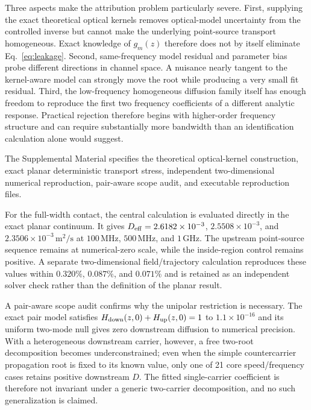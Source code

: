 \documentclass[aps,pra,twocolumn,superscriptaddress,nofootinbib]{revtex4-2}
\begin{document}
Three aspects make the attribution problem particularly severe. First, supplying the exact theoretical optical kernels removes optical-model uncertainty from the controlled inverse but cannot make the underlying point-source transport homogeneous. Exact knowledge of $g_m(z)$ therefore does not by itself eliminate Eq.~\eqref{eq:leakage}. Second, same-frequency model residual and parameter bias probe different directions in channel space. A nuisance nearly tangent to the kernel-aware model can strongly move the root while producing a very small fit residual. Third, the low-frequency homogeneous diffusion family itself has enough freedom to reproduce the first two frequency coefficients of a different analytic response. Practical rejection therefore begins with higher-order frequency structure and can require substantially more bandwidth than an identification calculation alone would suggest.

The Supplemental Material specifies the theoretical optical-kernel construction, exact planar deterministic transport stress, independent two-dimensional numerical reproduction, pair-aware scope audit, and executable reproduction files.

For the full-width contact, the central calculation is evaluated directly in the exact planar continuum. It gives $D_{\rm eff}=2.6182\times10^{-3}$, $2.5508\times10^{-3}$, and $2.3506\times10^{-3}\,\mathrm{m^2/s}$ at $100\,\mathrm{MHz}$, $500\,\mathrm{MHz}$, and $1\,\mathrm{GHz}$. The upstream point-source sequence remains at numerical-zero scale, while the inside-region control remains positive. A separate two-dimensional field/trajectory calculation reproduces these values within $0.320\%$, $0.087\%$, and $0.071\%$ and is retained as an independent solver check rather than the definition of the planar result.

A pair-aware scope audit confirms why the unipolar restriction is necessary. The exact pair model satisfies $H_{\rm down}(z,0)+H_{\rm up}(z,0)=1$ to $1.1\times10^{-16}$ and its uniform two-mode null gives zero downstream diffusion to numerical precision. With a heterogeneous downstream carrier, however, a free two-root decomposition becomes underconstrained; even when the simple countercarrier propagation root is fixed to its known value, only one of 21 core speed/frequency cases retains positive downstream $D$. The fitted single-carrier coefficient is therefore not invariant under a generic two-carrier decomposition, and no such generalization is claimed.
\end{document}
